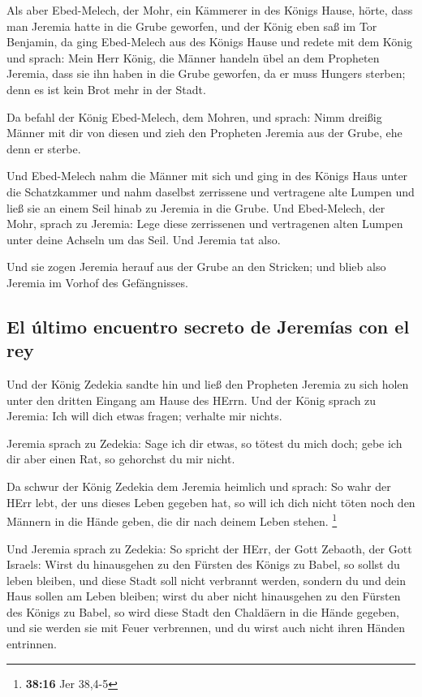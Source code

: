  Als aber Ebed-Melech, der Mohr, ein Kämmerer in des
Königs Hause, hörte, dass man Jeremia hatte in die Grube geworfen, und
der König eben saß im Tor Benjamin,  da ging Ebed-Melech
aus des Königs Hause und redete mit dem König und sprach: 
Mein Herr König, die Männer handeln übel an dem Propheten Jeremia, dass
sie ihn haben in die Grube geworfen, da er muss Hungers sterben; denn es
ist kein Brot mehr in der Stadt.

 Da befahl der König Ebed-Melech, dem Mohren, und sprach:
Nimm dreißig Männer mit dir von diesen und zieh den Propheten Jeremia
aus der Grube, ehe denn er sterbe.

 Und Ebed-Melech nahm die Männer mit sich und ging in des
Königs Haus unter die Schatzkammer und nahm daselbst zerrissene und
vertragene alte Lumpen und ließ sie an einem Seil hinab zu Jeremia in
die Grube.  Und Ebed-Melech, der Mohr, sprach zu Jeremia:
Lege diese zerrissenen und vertragenen alten Lumpen unter deine Achseln
um das Seil. Und Jeremia tat also.

 Und sie zogen Jeremia herauf aus der Grube an den
Stricken; und blieb also Jeremia im Vorhof des Gefängnisses.

\hypertarget{el-uxfaltimo-encuentro-secreto-de-jeremuxedas-con-el-rey}{%
\subsection{El último encuentro secreto de Jeremías con el
rey}\label{el-uxfaltimo-encuentro-secreto-de-jeremuxedas-con-el-rey}}

 Und der König Zedekia sandte hin und ließ den Propheten
Jeremia zu sich holen unter den dritten Eingang am Hause des HErrn. Und
der König sprach zu Jeremia: Ich will dich etwas fragen; verhalte mir
nichts.

 Jeremia sprach zu Zedekia: Sage ich dir etwas, so tötest
du mich doch; gebe ich dir aber einen Rat, so gehorchst du mir nicht.

 Da schwur der König Zedekia dem Jeremia heimlich und
sprach: So wahr der HErr lebt, der uns dieses Leben gegeben hat, so will
ich dich nicht töten noch den Männern in die Hände geben, die dir nach
deinem Leben stehen. \footnote{\textbf{38:16} Jer 38,4-5}

 Und Jeremia sprach zu Zedekia: So spricht der HErr, der
Gott Zebaoth, der Gott Israels: Wirst du hinausgehen zu den Fürsten des
Königs zu Babel, so sollst du leben bleiben, und diese Stadt soll nicht
verbrannt werden, sondern du und dein Haus sollen am Leben bleiben;
 wirst du aber nicht hinausgehen zu den Fürsten des
Königs zu Babel, so wird diese Stadt den Chaldäern in die Hände gegeben,
und sie werden sie mit Feuer verbrennen, und du wirst auch nicht ihren
Händen entrinnen.

